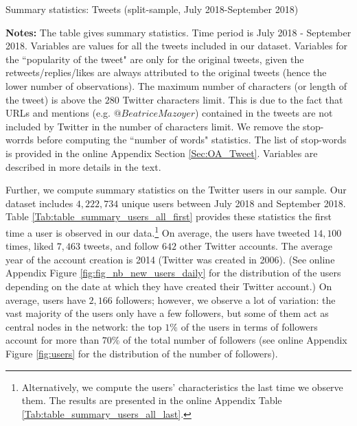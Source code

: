 \begin{table}
\caption{Summary statistics: Tweets (split-sample, July 2018-September 2018)}
\begin{center}
	
\end{center}
\begin{spacing}{0.5}
	{\fns \textbf{Notes:} The table gives summary statistics. Time period is July 2018 - September 2018. Variables are values for all the tweets included in our dataset. Variables for the ``popularity of the tweet" are only for the original tweets, given the retweets/replies/likes are always attributed to the original tweets (hence the lower number of observations). The maximum number of characters (or length of the tweet) is above the $280$ Twitter characters limit. This is due to the fact that URLs and mentions (e.g. $@BeatriceMazoyer$) contained in the tweets are not included by Twitter in the number of characters limit. We remove the stop-worrds before computing the ``number of words" statistics. The list of stop-words is provided in the online Appendix Section \ref{Sec:OA_Tweet}. Variables are described in more details in the text.} 
\end{spacing}
\label{Tab:sum_stat_tweets_split_sample}
\end{table} 

Further, we compute summary statistics on the Twitter users in our sample. Our dataset includes $4,222,734$ unique users between July 2018 and September 2018. Table \ref{Tab:table_summary_users_all_first} provides these statistics the first time a user is observed in our data.\footnote{Alternatively, we compute the users' characteristics the last time we observe them. The results are presented in the online Appendix Table \ref{Tab:table_summary_users_all_last}.} On average, the users have tweeted $14,100$ times, liked $7,463$ tweets, and follow $642$ other Twitter accounts. The average year of the account creation is 2014 (Twitter was created in 2006). (See online Appendix Figure \ref{fig:fig_nb_new_users_daily} for the distribution of the users depending on the date at which they have created their Twitter account.) On average, users have $2,166$ followers; however, we observe a lot of variation: the vast majority of the users only have a few followers, but some of them act as central nodes in the network: the top $1\%$ of the users in terms of followers  account for more than $70\%$ of the total number of followers (see online Appendix Figure \ref{fig:users} for the distribution of the number of followers).

